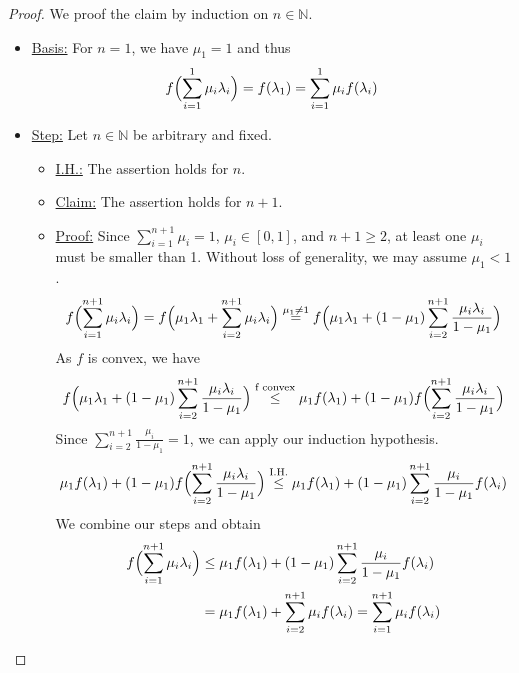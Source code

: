 \begin{proof}
We proof the claim by induction on $n\in\mathbb{N}$.
\begin{itemize}
\item\underline{Basis:} For $n=1$, we have $\mu_1=1$ and thus
\begin{equation*}
	f\Bigl(\sum\limits_{i=1}^1\mu_i\lambda_i\Bigr)=f(\lambda_1)=\sum\limits_{i=1}^1\mu_if(\lambda_i)
\end{equation*}
\item\underline{Step:} Let $n\in\mathbb{N}$ be arbitrary and fixed.
\begin{itemize}
	\item\underline{I.H.:} The assertion holds for $n$.
	\item\underline{Claim:} The assertion holds for $n+1$.
	\item\underline{Proof:} Since $\sum\limits_{i=1}^{n+1}\mu_i=1$, $\mu_i\in[0,1]$, and $n+1\ge 2$, at least one $\mu_i$ must be smaller than 1. Without loss of generality, we may assume $\mu_1<1$.
	\begin{equation*}
		f\Bigl(\sum\limits_{i=1}^{n+1}\mu_i\lambda_i\Bigr)=f\Bigl(\mu_1\lambda_1+\sum\limits_{i=2}^{n+1}\mu_i\lambda_i\Bigr)\stackrel{\mu_1\neq1}{=}f\Bigl(\mu_1\lambda_1+(1-\mu_1)\sum\limits_{i=2}^{n+1}\frac{\mu_i\lambda_i}{1-\mu_1}\Bigr)
	\end{equation*}
	As $f$ is convex, we have
	\begin{equation*}
		f\Bigl(\mu_1\lambda_1+(1-\mu_1)\sum\limits_{i=2}^{n+1}\frac{\mu_i\lambda_i}{1-\mu_1}\Bigr)\stackrel{\text{f convex}}{\le} \mu_1f(\lambda_1)+(1-\mu_1)f\Bigl(\sum\limits_{i=2}^{n+1}\frac{\mu_i\lambda_i}{1-\mu_1}\Bigr)
	\end{equation*}
	Since $\sum\limits_{i=2}^{n+1}\frac{\mu_i}{1-\mu_1}=1$, we can apply our induction hypothesis.
	\begin{equation*}
		\mu_1f(\lambda_1)+(1-\mu_1)f\Bigl(\sum\limits_{i=2}^{n+1}\frac{\mu_i\lambda_i}{1-\mu_1}\Bigr)\stackrel{\text{I.H.}}{\le} \mu_1f(\lambda_1)+(1-\mu_1)\sum\limits_{i=2}^{n+1}\frac{\mu_i}{1-\mu_1}f(\lambda_i)
	\end{equation*}
	We combine our steps and obtain
	\begin{align*}
		f\Bigl(\sum\limits_{i=1}^{n+1}\mu_i\lambda_i\Bigr)&\le \mu_1f(\lambda_1)+(1-\mu_1)\sum\limits_{i=2}^{n+1}\frac{\mu_i}{1-\mu_1}f(\lambda_i)\\
		&=\mu_1f(\lambda_1)+\sum\limits_{i=2}^{n+1}\mu_if(\lambda_i)=\sum_{i=1}^{n+1} \mu_i f(\lambda_i)\qedhere
	\end{align*}
\end{itemize}
\end{itemize}
\end{proof}
